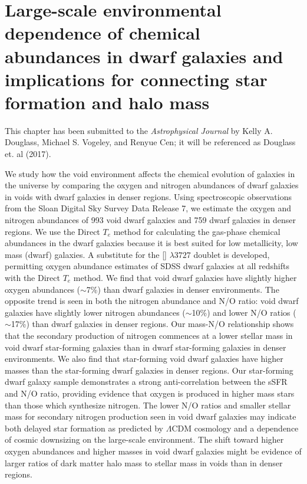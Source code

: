 \chapter[O$^+$ approximation]{Large-scale environmental dependence of chemical abundances in dwarf galaxies and implications for connecting star formation and halo mass}\label{ch:Paper3}


This chapter has been submitted to the \emph{Astrophysical Journal} by Kelly A. 
Douglass, Michael S. Vogeley, and Renyue Cen; it will be referenced as Douglass 
et. al (2017).



%
%
\begin{chapabstract}
We study how the void environment affects the chemical evolution of galaxies in 
the universe by comparing the oxygen and nitrogen abundances of dwarf galaxies 
in voids with dwarf galaxies in denser regions.  Using spectroscopic 
observations from the Sloan Digital Sky Survey Data Release 7, we estimate the 
oxygen and nitrogen abundances of 993 void dwarf galaxies and 759 dwarf galaxies 
in denser regions.  We use the Direct $T_e$ method for calculating the gas-phase 
chemical abundances in the dwarf galaxies because it is best suited for low 
metallicity, low mass (dwarf) galaxies.  A substitute for the [] 
$\lambda 3727$ doublet is developed, permitting oxygen abundance estimates of 
SDSS dwarf galaxies at all redshifts with the Direct $T_e$ method.  We find that 
void dwarf galaxies have slightly higher oxygen abundances ($\sim$7\%) than 
dwarf galaxies in denser environments.  The opposite trend is seen in both the 
nitrogen abundance and N/O ratio: void dwarf galaxies have slightly lower 
nitrogen abundances ($\sim$10\%) and lower N/O ratios ($\sim$17\%) than dwarf 
galaxies in denser regions.  Our mass-N/O relationship shows that the secondary 
production of nitrogen commences at a lower stellar mass in void dwarf 
star-forming galaxies than in dwarf star-forming galaxies in denser 
environments.  We also find that star-forming void dwarf galaxies have higher 
 masses than the star-forming dwarf galaxies in denser regions.  Our 
star-forming dwarf galaxy sample demonstrates a strong anti-correlation between 
the sSFR and N/O ratio, providing evidence that oxygen is produced in higher 
mass stars than those which synthesize nitrogen.  The lower N/O ratios and 
smaller stellar mass for secondary nitrogen production seen in void dwarf 
galaxies may indicate both delayed star formation as predicted by $\Lambda$CDM 
cosmology and a dependence of cosmic downsizing on the large-scale environment.  
The shift toward higher oxygen abundances and higher  masses in void 
dwarf galaxies might be evidence of larger ratios of dark matter halo mass to 
stellar mass in voids than in denser regions.
\end{chapabstract}


